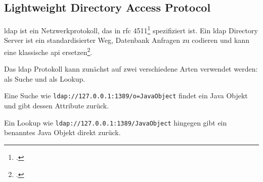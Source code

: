
\subsection{Lightweight Directory Access Protocol}\label{subsec:ldap}
\gls{ldap} ist ein Netzwerkprotokoll, das in \gls{rfc} 4511\footcite{rfc4511} spezifiziert ist.
Ein \gls{ldap} Directory Server ist ein standardisierter Weg, Datenbank Anfragen zu codieren und kann eine klassische \gls{api} ersetzen\footcite{ldapWebsite}.

Das \gls{ldap} Protokoll kann zunächst auf zwei verschiedene Arten verwendet werden: als Suche und als Lookup.

Eine Suche wie \verb|ldap://127.0.0.1:1389/o=JavaObject| findet ein Java Objekt und gibt dessen Attribute zurück.

Ein Lookup wie \verb|ldap://127.0.0.1:1389/JavaObject| hingegen gibt ein benanntes Java Objekt direkt zurück.
